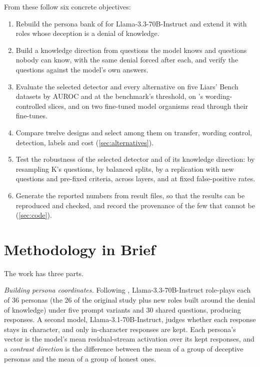 From these follow six concrete objectives:
\begin{enumerate}[leftmargin=1.6em, itemsep=2pt]
\item Rebuild the persona bank of \textcite{mahadik2026persona} for Llama-3.3-70B-Instruct and extend
  it with roles whose deception is a denial of knowledge.
\item Build a knowledge direction from questions the model knows and questions nobody can know, with
  the same denial forced after each, and verify the questions against the model's own answers.
\item Evaluate the selected detector and every alternative on five Liars' Bench datasets by AUROC and
  at the benchmark's threshold, on \hpkr's wording-controlled slices, and on two fine-tuned model
  organisms read through their fine-tunes.
\item Compare twelve designs and select among them on transfer, wording control, detection, labels
  and cost (\cref{sec:alternatives}).
\item Test the robustness of the selected detector and of its knowledge direction: by resampling K's
  questions, by balanced splits, by a replication with new questions and pre-fixed criteria, across
   layers, and at fixed false-positive rates.
\item Generate the reported numbers from result files, so that the results can be reproduced and
  checked, and record the provenance of the few that cannot be (\cref{sec:code}).
\end{enumerate}

\section{Methodology in Brief}
\label{sec:method-brief}

The work has three parts.

\emph{Building persona coordinates.} Following \textcite{mahadik2026persona}, Llama-3.3-70B-Instruct
role-plays each of 36 personas (the 26 of the original study plus  new roles built around
the denial of knowledge) under five prompt variants and 30 shared questions, producing
 responses. A second model, Llama-3.1-70B-Instruct, judges whether each response
stays in character, and only in-character responses are kept. Each persona's vector is the model's
mean residual-stream activation over its kept responses, and a \emph{contrast direction} is the
difference between the mean of a group of deceptive personas and the mean of a group of honest ones.

